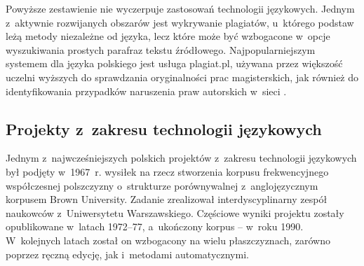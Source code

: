 \begin{multicols}{2}
Powyższe zestawienie nie wyczerpuje zastosowań technologii
językowych. Jednym z~aktywnie rozwijanych obszarów jest wykrywanie
plagiatów, u~którego podstaw leżą metody niezależne od języka,
lecz które może być wzbogacone w~opcje wyszukiwania prostych
parafraz tekstu źródłowego. Najpopularniejszym systemem dla języka
polskiego jest usługa plagiat.pl, używana przez większość
uczelni wyższych do sprawdzania oryginalności prac magisterskich,
jak również do identyfikowania przypadków naruszenia praw
autorskich w~sieci \cite{plagiat1}. 

\subsection[Projekty z~zakresu technologii językowych]{Projekty
z~zakresu technologii językowych} 

Jednym z~najwcześniejszych polskich projektów z~zakresu technologii
językowych był podjęty w~1967~r. wysiłek na rzecz stworzenia
korpusu frekwencyjnego współczesnej polszczyzny o~strukturze
porównywalnej z~anglojęzycznym korpusem Brown University. Zadanie
zrealizował interdyscyplinarny zespół naukowców z~Uniwersytetu
Warszawskiego. Częściowe wyniki projektu zostały opublikowane
w~latach 1972--77, a~ukończony korpus – w~roku 1990. W~kolejnych
latach został on wzbogacony na wielu płaszczyznach, zarówno poprzez
ręczną edycję, jak i~metodami automatycznymi. 


\end{multicols}
